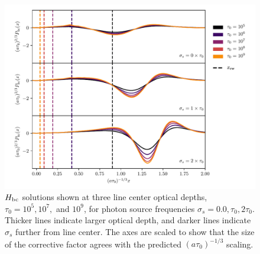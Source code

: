 \documentclass{aastex63}
\begin{document}
\begin{figure}
    \centering
    \includegraphics[width=\textwidth]{xinit.pdf}
    \caption{$H_{\rm bc}$ solutions shown at three line center optical depths, $\tau_0=10^5, 10^7,$ and $10^9$, for photon source frequencies $\sigma_s=0.0, \tau_0, 2\tau_0$. Thicker lines indicate larger optical depth, and darker lines indicate $\sigma_s$ further from line center. The axes are scaled to show that the size of the corrective factor agrees with the predicted $(a\tau_0)^{-1/3}$ scaling.}
    \label{fig:xinit}
\end{figure}
\end{document}
